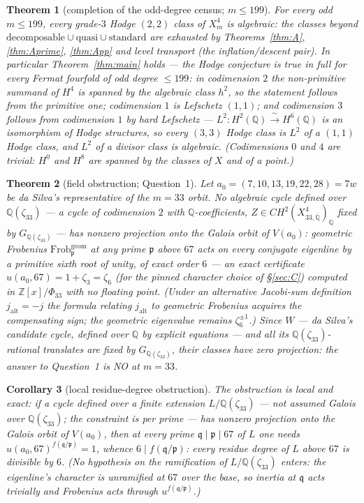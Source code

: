 \documentclass[11pt]{amsart}
\newtheorem{theorem}{Theorem}[section]
\newtheorem{corollary}[theorem]{Corollary}
\theoremstyle{remark}
\newcommand{\Q}{\mathbb{Q}}
\newcommand{\Z}{\mathbb{Z}}
\newcommand{\V}{V}
\newcommand{\zt}{\zeta}
\newcommand{\Qbar}{\overline{\Q}}
\begin{document}
\begin{theorem}[completion of the odd-degree census; $m\le199$]\label{thm:B}
For every odd $m\le199$, every grade-$3$ Hodge $(2,2)$ class of $X^4_m$ is algebraic: the classes
beyond $\text{decomposable}\cup\text{quasi}\cup\text{standard}$ are exhausted by
Theorems~\ref{thm:A}, \ref{thm:Aprime}, \ref{thm:App} and level transport (the inflation/descent
pair). In particular Theorem~\ref{thm:main} holds --- the Hodge conjecture is true \emph{in full}
for every Fermat fourfold of odd degree $\le199$: in codimension $2$ the non-primitive summand of $H^4$ is spanned by the
algebraic class $h^2$, so the statement follows from the primitive one; codimension $1$ is
Lefschetz $(1,1)$; and codimension $3$ follows from codimension $1$ by hard Lefschetz ---
$L^2\colon H^2(\Q)\xrightarrow{\ \sim\ }H^6(\Q)$ is an isomorphism of Hodge structures, so
every $(3,3)$ Hodge class is $L^2$ of a $(1,1)$ Hodge class, and $L^2$ of a divisor class is
algebraic. (Codimensions $0$ and $4$ are trivial: $H^0$ and $H^8$ are spanned by the classes of
$X$ and of a point.)
\end{theorem}

\begin{theorem}[field obstruction; Question~1]\label{thm:C}
Let $a_0=(7,10,13,19,22,28)=7w$ be da Silva's representative of the $m=33$ orbit. No algebraic cycle
defined over $\Q(\zt_{33})$ --- a cycle of codimension $2$ with $\Q$-coefficients,
$Z\in CH^2(X^4_{33,\Qbar})_\Q$ fixed by $G_{\Q(\zt_{33})}$ --- has nonzero projection onto the
Galois orbit of $\V(a_0)$: \emph{geometric} Frobenius $\mathrm{Frob}^{\mathrm{geom}}_{\mathfrak p}$
at any prime $\mathfrak p$ above $67$ acts on every conjugate eigenline by a primitive sixth
root of unity, of exact order $6$ --- an exact certificate $u(a_0,67)=1+\zt_3=\zt_6$ (for the pinned character
choice of \S\ref{sec:C}) computed
in $\Z[x]/\Phi_{33}$ with no floating point. (Under an alternative Jacobi-sum definition
$j_{\mathrm{alt}}=-j$ the formula relating $j_{\mathrm{alt}}$ to geometric Frobenius acquires
the compensating sign; the geometric eigenvalue remains $\zt_6^{\pm1}$.) Since $W$ --- da Silva's candidate cycle, defined over $\Q$ by explicit equations
\cite[Question~1]{daSilva} --- and all its $\Q(\zt_{33})$-rational translates are fixed by
$G_{\Q(\zt_{33})}$, their classes have zero projection: \emph{the answer to Question~1 is NO at $m=33$}.
\end{theorem}
\begin{corollary}[local residue-degree obstruction]\label{cor:resdeg}
The obstruction is local and exact: if a cycle defined over a finite extension
$L/\Q(\zt_{33})$ --- not assumed Galois over $\Q(\zt_{33})$; the constraint is per prime ---
has nonzero projection onto the Galois orbit of $\V(a_0)$, then at every prime
$\mathfrak q\mid\mathfrak p\mid67$ of $L$ one needs
$u(a_0,67)^{f(\mathfrak q/\mathfrak p)}=1$, whence $6\mid f(\mathfrak q/\mathfrak p)$:
every residue degree of $L$ above $67$ is divisible by $6$. (No hypothesis on the ramification
of $L/\Q(\zt_{33})$ enters: the eigenline's character is unramified at $67$ over the base, so
inertia at $\mathfrak q$ acts trivially and Frobenius acts through
$u^{f(\mathfrak q/\mathfrak p)}$.)
\end{corollary}
\end{document}
